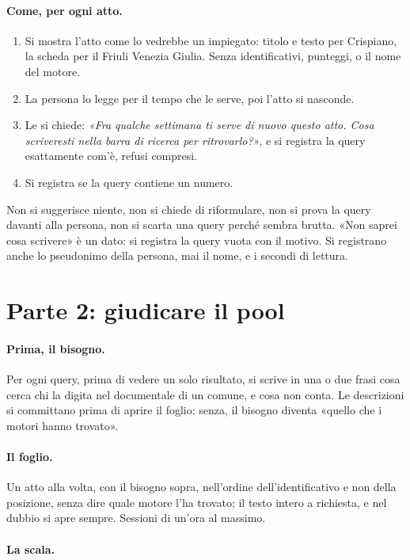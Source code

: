 \paragraph{Come, per ogni atto.}
\begin{enumerate}
  \item Si mostra l'atto come lo vedrebbe un impiegato: titolo e testo per
        Crispiano, la scheda per il Friuli Venezia Giulia. Senza identificativi,
        punteggi, o il nome del motore.
  \item La persona lo legge per il tempo che le serve, poi l'atto si nasconde.
  \item Le si chiede: \emph{«Fra qualche settimana ti serve di nuovo questo atto.
        Cosa scriveresti nella barra di ricerca per ritrovarlo?»}, e si registra la
        query esattamente com'è, refusi compresi.
  \item Si registra se la query contiene un numero.
\end{enumerate}
Non si suggerisce niente, non si chiede di riformulare, non si prova la query
davanti alla persona, non si scarta una query perché sembra brutta. «Non saprei
cosa scrivere» è un dato: si registra la query vuota con il motivo. Si registrano
anche lo pseudonimo della persona, mai il nome, e i secondi di lettura.

\section*{Parte 2: giudicare il pool}

\paragraph{Prima, il bisogno.} Per ogni query, prima di vedere un solo risultato,
si scrive in una o due frasi cosa cerca chi la digita nel documentale di un comune,
e cosa non conta. Le descrizioni si committano prima di aprire il foglio: senza, il
bisogno diventa «quello che i motori hanno trovato».

\paragraph{Il foglio.} Un atto alla volta, con il bisogno sopra, nell'ordine
dell'identificativo e non della posizione, senza dire quale motore l'ha trovato;
il testo intero a richiesta, e nel dubbio si apre sempre. Sessioni di un'ora al
massimo.

\paragraph{La scala.}

